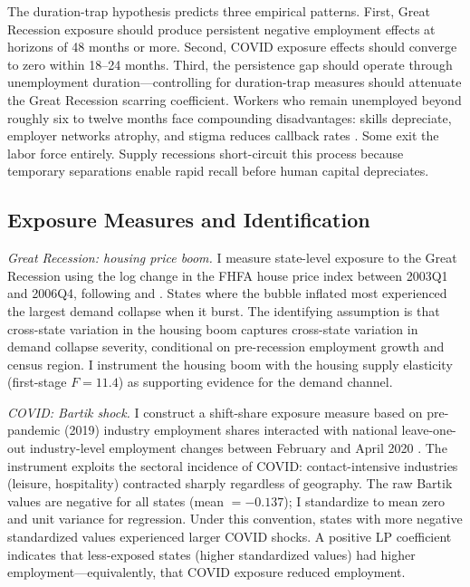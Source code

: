 \documentclass[12pt]{article}
\begin{document}
The duration-trap hypothesis predicts three empirical patterns. First, Great Recession exposure should produce persistent negative employment effects at horizons of 48 months or more. Second, COVID exposure effects should converge to zero within 18--24 months. Third, the persistence gap should operate through unemployment duration---controlling for duration-trap measures should attenuate the Great Recession scarring coefficient. Workers who remain unemployed beyond roughly six to twelve months face compounding disadvantages: skills depreciate, employer networks atrophy, and stigma reduces callback rates \citep{kroft2016long}. Some exit the labor force entirely. Supply recessions short-circuit this process because temporary separations enable rapid recall before human capital depreciates.

\subsection{Exposure Measures and Identification}

\textit{Great Recession: housing price boom.} I measure state-level exposure to the Great Recession using the log change in the FHFA house price index between 2003Q1 and 2006Q4, following \citet{mian2014explains} and \citet{charles2016masking}. States where the bubble inflated most experienced the largest demand collapse when it burst. The identifying assumption is that cross-state variation in the housing boom captures cross-state variation in demand collapse severity, conditional on pre-recession employment growth and census region. I instrument the housing boom with the \citet{saiz2010geographic} housing supply elasticity (first-stage $F = 11.4$) as supporting evidence for the demand channel.

\textit{COVID: Bartik shock.} I construct a shift-share exposure measure based on pre-pandemic (2019) industry employment shares interacted with national leave-one-out industry-level employment changes between February and April 2020 \citep{goldsmith2020bartik, borusyak2022quasi}. The instrument exploits the sectoral incidence of COVID: contact-intensive industries (leisure, hospitality) contracted sharply regardless of geography. The raw Bartik values are negative for all states (mean $= -0.137$); I standardize to mean zero and unit variance for regression. Under this convention, states with more negative standardized values experienced larger COVID shocks. A positive LP coefficient indicates that less-exposed states (higher standardized values) had higher employment---equivalently, that COVID exposure reduced employment.
\end{document}
